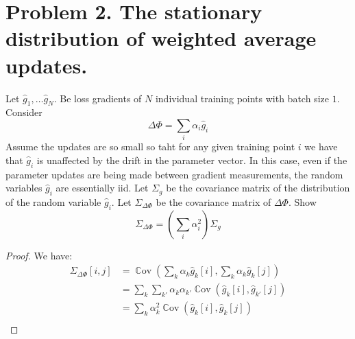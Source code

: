 \documentclass{amsart}
\newcommand{\Cov}[1]{\operatorname{\mathbb{C}ov}\left(#1\right)}
\theoremstyle{definition}
\begin{document}
\section*{Problem 2. The stationary distribution of weighted average updates. }
Let $\hat{g}_1, \ldots \hat{g}_N$. Be loss gradients of $N$ individual training points with batch size $1$. 
Consider 
\[
\Delta \Phi = \sum_{i} \alpha_i \hat{g}_i
\]
Assume the updates are so small so taht for any given training point $i$ we have that $\hat{g}_i$ is unaffected by the drift in the parameter vector.
In this case, even if the parameter updates are being made between gradient measurements, the random variables $\hat{g}_i$ are essentially iid. 
Let $\Sigma_g$ be the covariance matrix of the distribution of the random variable $\hat{g}_i$. 
Let $\Sigma_{\Delta \Phi}$ be the covariance matrix of $\Delta \Phi$. 
Show
\[
\Sigma_{\Delta\Phi} = \left(
\sum_{i} \alpha_i^2
\right) \Sigma_g
\]
\begin{proof}
  We have:
  \begin{align*}
    \Sigma_{\Delta\Phi}[i,j] &= \Cov{\sum_{k} \alpha_k \hat{g}_k[i], \sum_{k} \alpha_k \hat{g}_k[j]} \\
    &= \sum_{k} \sum_{k'} \alpha_k \alpha_{k'} \Cov{\hat{g}_k[i], \hat{g}_{k'}[j]} \\
    &= \sum_{k} \alpha_k^2 \Cov{\hat{g}_k[i], \hat{g}_k[j]} \\
  \end{align*}
\end{proof}
\end{document}
